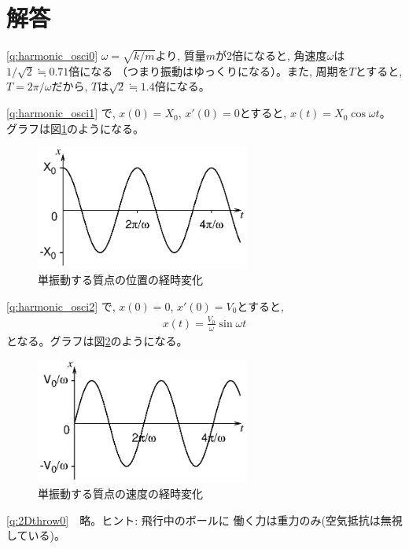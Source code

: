 \section{解答}
%
\ref{q:harmonic_osci0}
$\omega=\sqrt{k/m}$より, 質量$m$が2倍になると, 角速度$\omega$は$1/\sqrt{2}\fallingdotseq0.71$倍になる
（つまり振動はゆっくりになる）。また, 周期を$T$とすると, $T=2\pi/\omega$だから, $T$は$\sqrt{2}\fallingdotseq1.4$倍になる。\mv

%
\ref{q:harmonic_osci1}
で, $x(0)=X_0$, $x'(0)=0$とすると, $x(t)=X_0\cos\omega t$。
グラフは図\ref{fig:springX0}のようになる。
\begin{figure}[h]
    \centering
    \includegraphics[width=7cm]{springX0.eps}
    \caption{単振動する質点の位置の経時変化}\label{fig:springX0}
\end{figure}

%
\ref{q:harmonic_osci2}
で, $x(0)=0$, $x'(0)=V_0$とすると, 
\begin{eqnarray}x(t)=\frac{V_0}{\omega}\sin\omega t\end{eqnarray}
となる。グラフは図\ref{fig:springV0}のようになる。\mv
\begin{figure}[h]
    \centering
    \includegraphics[width=7cm]{springV0.eps}
    \caption{単振動する質点の速度の経時変化}\label{fig:springV0}
\end{figure}

\ref{q:2Dthrow0}　略。ヒント: 飛行中のボールに
働く力は重力のみ(空気抵抗は無視している)。\\

